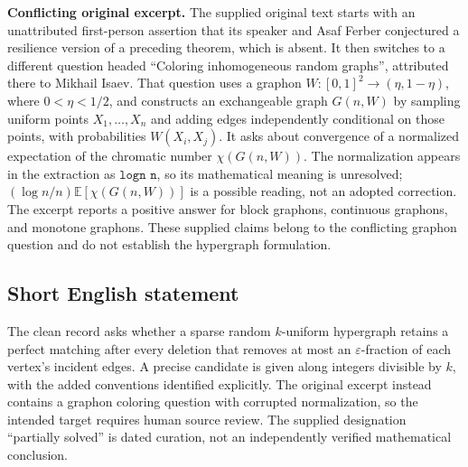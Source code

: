 \documentclass[11pt]{article}
\begin{document}
\textbf{Conflicting original excerpt.} The supplied original text starts with an unattributed first-person assertion that its speaker and Asaf Ferber conjectured a resilience version of a preceding theorem, which is absent. It then switches to a different question headed ``Coloring inhomogeneous random graphs'', attributed there to Mikhail Isaev. That question uses a graphon \(W:[0,1]^2\to(\eta,1-\eta)\), where \(0<\eta<1/2\), and constructs an exchangeable graph \(G(n,W)\) by sampling uniform points \(X_1,\ldots,X_n\) and adding edges independently conditional on those points, with probabilities \(W(X_i,X_j)\). It asks about convergence of a normalized expectation of the chromatic number \(\chi(G(n,W))\). The normalization appears in the extraction as \(\texttt{logn n}\), so its mathematical meaning is unresolved; \((\log n/n)\mathbb E[\chi(G(n,W))]\) is a possible reading, not an adopted correction. The excerpt reports a positive answer for block graphons, continuous graphons, and monotone graphons. These supplied claims belong to the conflicting graphon question and do not establish the hypergraph formulation.
\subsection{Short English statement}
The clean record asks whether a sparse random \(k\)-uniform hypergraph retains a perfect matching after every deletion that removes at most an \(\varepsilon\)-fraction of each vertex's incident edges. A precise candidate is given along integers divisible by \(k\), with the added conventions identified explicitly. The original excerpt instead contains a graphon coloring question with corrupted normalization, so the intended target requires human source review. The supplied designation ``partially solved'' is dated curation, not an independently verified mathematical conclusion.
\end{document}

